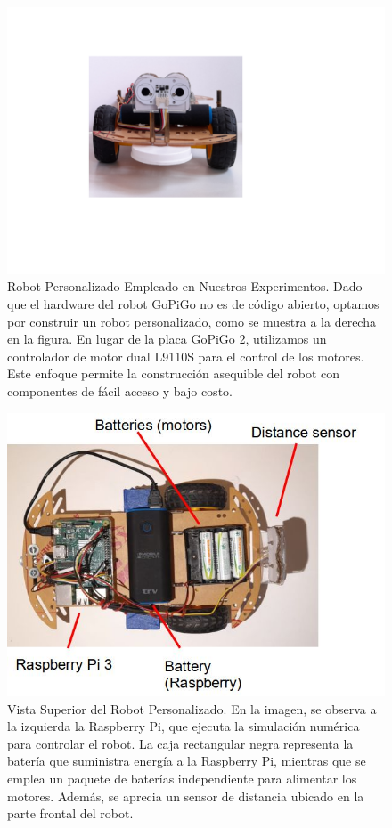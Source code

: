 \begin{figure}[h!]
	\centering\includegraphics[width=\imsize]{robot_personalizado}
	\caption[Robot Personalizado Empleado en Nuestros Experimentos. ]{ Robot Personalizado Empleado en Nuestros Experimentos. Dado que el hardware del robot GoPiGo no es de código abierto, optamos por construir un robot personalizado, como se muestra a la derecha en la figura. En lugar de la placa GoPiGo 2, utilizamos un controlador de motor dual L9110S para el control de los motores. Este enfoque permite la construcción asequible del robot con componentes de fácil acceso y bajo costo.}\label{fig:robot_personalizado}
\end{figure}


\begin{figure}[h!]
	\centering\includegraphics[width=\imsize]{robot_nuestro1.png}
	\caption[Vista Superior del Robot Personalizado.  ]{ Vista Superior del Robot Personalizado. En la imagen, se observa a la izquierda la Raspberry Pi, que ejecuta la simulación numérica para controlar el robot. La caja rectangular negra representa la batería que suministra energía a la Raspberry Pi, mientras que se emplea un paquete de baterías independiente para alimentar los motores. Además, se aprecia un sensor de distancia ubicado en la parte frontal del robot. }\label{fig:robot_nuestro1}
\end{figure}



